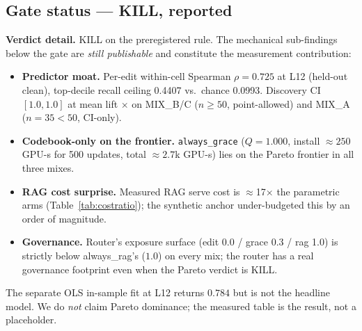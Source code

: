 \documentclass[preprint,12pt]{elsarticle}
\begin{document}
\subsection{Gate status --- KILL, reported}
\begin{table}[t]
\centering
\caption{Frozen-gate status on the full 99-cell wave-1 grid. The verdict rule
(PASS = K\_A $\wedge$ K\_A$'$; KILL = $\neg$K\_A $\wedge$ $\neg$K\_A$'$; GREY otherwise)
returns KILL. The KILL is the paper-level claim; the rows below are the
mechanical sub-findings.}
\label{tab:gate}
\footnotesize
{}
\end{table}

{\footnotesize
\noindent\textbf{Verdict detail.} KILL on the preregistered rule. The mechanical
sub-findings below the gate are \emph{still publishable} and constitute the
measurement contribution:
\begin{itemize}
\item \textbf{Predictor moat.} Per-edit within-cell Spearman $\rho = 0.725$ at L12
(held-out clean), top-decile recall ceiling 0.4407 vs.\ chance 0.0993. Discovery CI
$[1.0, 1.0]$ at mean lift \discLift$\times$ on MIX\_B/C ($n \ge 50$, point-allowed)
and MIX\_A ($n = 35 < 50$, CI-only).
\item \textbf{Codebook-only on the frontier.} \texttt{always\_grace} ($Q = 1.000$,
install $\approx 250$ GPU-s for 500 updates, total $\approx 2.7$k GPU-s) lies on
the Pareto frontier in all three mixes.
\item \textbf{RAG cost surprise.} Measured RAG serve cost is $\approx$17$\times$ the
parametric arms (Table~\ref{tab:costratio}); the synthetic anchor under-budgeted this
by an order of magnitude.
\item \textbf{Governance.} Router's exposure surface (edit 0.0 / grace 0.3 / rag 1.0)
is strictly below always\_rag's ($1.0$) on every mix; the router has a real
governance footprint even when the Pareto verdict is KILL.
\end{itemize}
The separate OLS in-sample fit at L12 returns $0.784$ but is not the headline
model. We do \emph{not} claim Pareto dominance; the measured table is the result,
not a placeholder.
\par}
\end{document}
